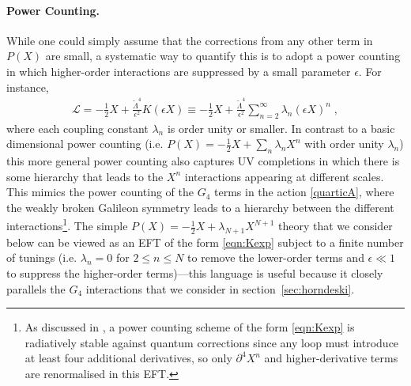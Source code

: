 \documentclass[11pt]{article}
\newcommand{\LambdaP}{\tilde{\Lambda}}
\begin{document}
\paragraph{Power Counting.}
While one could simply assume that the corrections from any other term in $P(X)$ are small, a systematic way to quantify this is to adopt a power counting in which higher-order interactions are suppressed by a small parameter $\epsilon$. For instance, 
\begin{align}
\mathcal{L}   =  - \frac{1}{2} X + \frac{ \LambdaP^4}{\epsilon^2} K \left(  \epsilon X  \right)   \equiv -\frac{1}{2} X +  \frac{ \LambdaP^4}{\epsilon^2}  \sum_{n=2}^\infty  \lambda_n \left( \epsilon X \right)^n   \; ,
\label{eqn:Kexp}
\end{align}
where each coupling constant $\lambda_n$ is order unity or smaller.
In contrast to a basic dimensional power counting (i.e. $P(X) = - \tfrac{1}{2} X + \sum_n \lambda_n X^n$ with order unity $\lambda_n$) this more general power counting also captures UV completions in which there is some hierarchy that leads to the $X^n$ interactions appearing at different scales. 
This mimics the power counting of the $G_4$ terms in the action \eqref{quarticA}, where the weakly broken Galileon symmetry leads to a hierarchy between the different interactions\footnote{
As discussed in \cite{Goon:2016ihr}, a power counting scheme of the  form \eqref{eqn:Kexp} is radiatively stable against quantum corrections since any loop must introduce at least four additional derivatives, so only $\partial^4 X^n$ and higher-derivative terms are renormalised in this EFT.  
}. 
The simple $P(X) = - \tfrac{1}{2} X + \lambda_{N+1} X^{N+1}$ theory that we consider below can be viewed as an EFT of the form \eqref{eqn:Kexp} subject to a finite number of tunings (i.e. $\lambda_n =0$ for $2 \leq n \leq N$ to remove the lower-order terms and $\epsilon \ll 1$ to suppress the higher-order terms)---this language is useful because it closely parallels the $G_4$ interactions that we consider in section~\ref{sec:horndeski}. 


\end{document}
